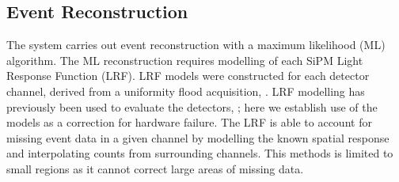 \subsection{Event Reconstruction}
The system carries out event reconstruction with a maximum likelihood (ML) algorithm. The ML reconstruction requires modelling of each SiPM Light Response Function (LRF). LRF models were constructed for each detector channel, derived from a uniformity flood acquisition, \cite{6359814}. LRF modelling has previously been used to evaluate the detectors, \cite{8069405}; here we establish use of the models as a correction for hardware failure. The LRF is able to account for missing event data in a given channel by modelling the known spatial response and interpolating counts from surrounding channels. This methods is limited to small regions as it cannot correct large areas of missing data. 


